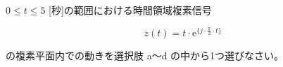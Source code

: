 $0 \leq t \leq 5$ [秒]の範囲における時間領域複素信号 

\[
z(t) = t \cdot \textrm{e}^{\{ j \cdot \frac{\pi}{2} \cdot t \}}
\]

\medskip
\noindent の複素平面内での動きを選択肢 a〜d の中から1つ選びなさい。
